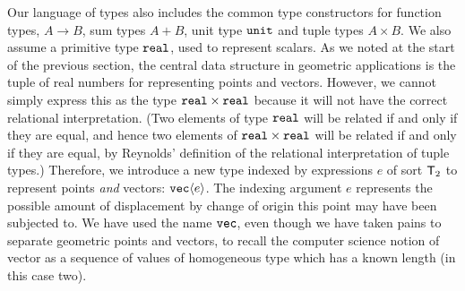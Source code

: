 Our language of types also includes the common type constructors for
function types, $A \to B$, sum types $A + B$, unit type
$\texttt{unit}$ and tuple types $A \times B$. We also assume a
primitive type $\texttt{real}$, used to represent scalars. As we
noted at the start of the previous section, the central data structure
in geometric applications is the tuple of real numbers for
representing points and vectors. However, we cannot simply express
this as the type $\texttt{real} \times \texttt{real}$ because it
will not have the correct relational interpretation. (Two elements of
type $\texttt{real}$ will be related if and only if they are equal,
and hence two elements of $\texttt{real} \times \texttt{real}$
will be related if and only if they are equal, by Reynolds' definition
of the relational interpretation of tuple types.) Therefore, we
introduce a new type indexed by expressions $e$ of sort
$\mathsf{T}_2$ to represent points \emph{and} vectors:
$\texttt{vec}\langle e \rangle$. The indexing argument $e$ represents the possible
amount of displacement by change of origin this point may have been
subjected to. We have used the name $\texttt{vec}$, even though we
have taken pains to separate geometric points and vectors, to recall
the computer science notion of vector as a sequence of values of
homogeneous type which has a known length (in this case two).

